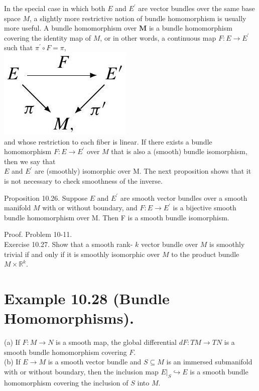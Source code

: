 \documentclass[10pt, letterpaper]{article}
\begin{document}
In the special case in which both $E$ and $E^{\prime}$ are vector bundles over the same base space $M$, a slightly more restrictive notion of bundle homomorphism is usually more useful. A bundle homomorphism over $\mathbf{M}$ is a bundle homomorphism covering the identity map of $M$, or in other words, a continuous map $F: E \rightarrow E^{\prime}$ such that $\pi^{\prime} \circ F=\pi$,\\
\includegraphics[scale=0.2, center]{2025_06_03_90f64b1a1e243cccc2e0g-279(1)}\\
and whose restriction to each fiber is linear. If there exists a bundle homomorphism $F: E \rightarrow E^{\prime}$ over $M$ that is also a (smooth) bundle isomorphism, then we say that\\
$E$ and $E^{\prime}$ are (smoothly) isomorphic over M. The next proposition shows that it is not necessary to check smoothness of the inverse.

Proposition 10.26. Suppose $E$ and $E^{\prime}$ are smooth vector bundles over a smooth manifold $M$ with or without boundary, and $F: E \rightarrow E^{\prime}$ is a bijective smooth bundle homomorphism over M. Then F is a smooth bundle isomorphism.

Proof. Problem 10-11.\\
Exercise 10.27. Show that a smooth rank- $k$ vector bundle over $M$ is smoothly trivial if and only if it is smoothly isomorphic over $M$ to the product bundle $M \times \mathbb{R}^{k}$.

\section*{Example 10.28 (Bundle Homomorphisms).}
(a) If $F: M \rightarrow N$ is a smooth map, the global differential $d F: T M \rightarrow T N$ is a smooth bundle homomorphism covering $F$.\\
(b) If $E \rightarrow M$ is a smooth vector bundle and $S \subseteq M$ is an immersed submanifold with or without boundary, then the inclusion map $\left.E\right|_{S} \hookrightarrow E$ is a smooth bundle homomorphism covering the inclusion of $S$ into $M$.
\end{document}
